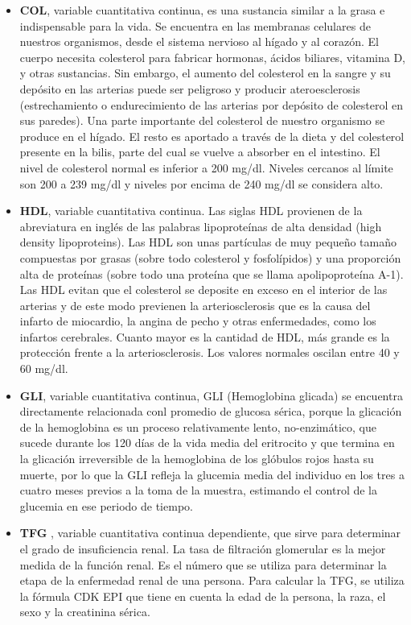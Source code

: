 \documentclass[runningheads,a4paper]{llncs}
\begin{document}
\begin{itemize}
\item \textbf{\ac{COL}}, variable cuantitativa continua,  es una sustancia similar a la grasa e indispensable para la vida. Se encuentra en las membranas celulares de nuestros organismos, desde el sistema nervioso al hígado y al corazón. El cuerpo necesita colesterol para fabricar hormonas, ácidos biliares, vitamina D, y otras sustancias. Sin embargo, el aumento del colesterol en la sangre y su depósito en las arterias puede ser peligroso y producir ateroesclerosis (estrechamiento o endurecimiento de las arterias por depósito de colesterol en sus paredes). Una parte importante del colesterol de nuestro organismo se produce en el hígado. El resto es aportado a través de la dieta y del colesterol presente en la bilis, parte del cual se vuelve a absorber en el intestino. El nivel de colesterol normal es inferior a 200 mg/dl. Niveles cercanos al límite son 200 a 239 mg/dl y niveles por encima de 240 mg/dl se considera alto.

\item \textbf{HDL}, variable cuantitativa continua. Las siglas HDL provienen de la abreviatura en inglés de las palabras lipoproteínas de alta densidad (high density lipoproteins). Las HDL son unas partículas de muy pequeño tamaño compuestas por grasas (sobre todo colesterol y fosfolípidos) y una proporción alta de proteínas (sobre todo una proteína que se llama apolipoproteína A-1).  Las HDL evitan que el colesterol se deposite en exceso en el interior de las arterias y de este modo previenen la arteriosclerosis que es la causa del infarto de miocardio, la angina de pecho y otras enfermedades, como los infartos cerebrales. Cuanto mayor es la cantidad de HDL, más grande es la protección frente a la arteriosclerosis. Los valores normales oscilan entre 40 y 60 mg/dl. 

\item \textbf{\ac{GLI}}, variable cuantitativa continua, GLI (Hemoglobina glicada) se encuentra directamente relacionada conl promedio de glucosa sérica, porque la glicación  de la hemoglobina es un proceso relativamente lento, no-enzimático, que sucede durante los 120 días de la vida media del eritrocito y que termina en la glicación irreversible de la hemoglobina de los glóbulos rojos hasta su muerte,  por lo que la GLI refleja la glucemia media del individuo en los tres a cuatro meses previos a la toma de la muestra, estimando el control de la glucemia en ese periodo de tiempo. 

\item \textbf{\ac{TFG}} , variable cuantitativa continua dependiente, que sirve para determinar el grado de insuficiencia renal. La tasa de filtración glomerular es la mejor medida de la función renal. Es el número que se utiliza para determinar la etapa de la enfermedad renal de una persona. Para calcular la \ac{TFG}, se utiliza la fórmula CDK EPI que tiene en cuenta la edad de la persona, la raza, el sexo y la creatinina sérica.

\end{itemize}
\end{document}
